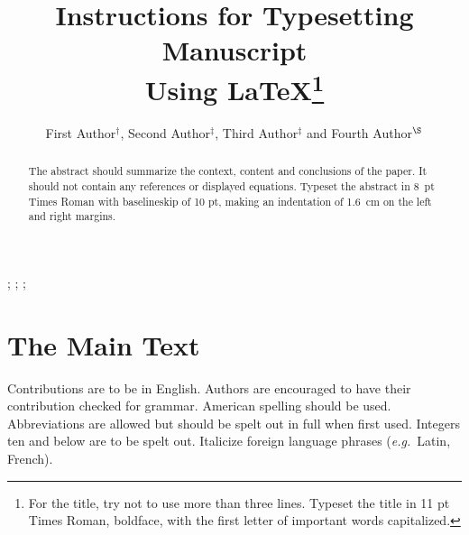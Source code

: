 \documentclass{ws-jai}
\begin{document}
\catchline{}{}{}{}{} %


\title{Instructions for Typesetting Manuscript\\
Using \LaTeX\footnote{For the title, try not to use more than
three lines. Typeset the title in 11 pt Times Roman,
boldface, with the first letter of important words capitalized.}}

\author{First Author$^\dagger$, Second Author$^\ddagger$, Third Author$^\ddagger$ and Fourth Author$^\S$}

\address{
$^\dagger$Department, University Name, City, State ZIP/Zone, Country, fauthor@university.com\\
$^\ddagger$Group, Company, Address, City, State ZIP/Zone, Country\\
$^\S$Group, Company, Address, City, State ZIP/Zone, Country, fauthor@company.com
}

\maketitle


\begin{history}
;
;
;
\end{history}

\begin{abstract}
The abstract should summarize the context, content and conclusions
of the paper. It should not contain any references or displayed
equations. Typeset the abstract in 8~pt Times Roman with
baselineskip of 10 pt, making an indentation of 1.6~cm on the left
and right margins.
\end{abstract}


\section{The Main Text}
\noindent Contributions are to be in English. Authors are
encouraged to have their contribution checked for grammar.
American spelling should be used. Abbreviations are allowed but
should be spelt out in full when first used. Integers ten and
below are to be spelt out. Italicize foreign language phrases
({\it e.g.}~Latin, French).
\end{document}
